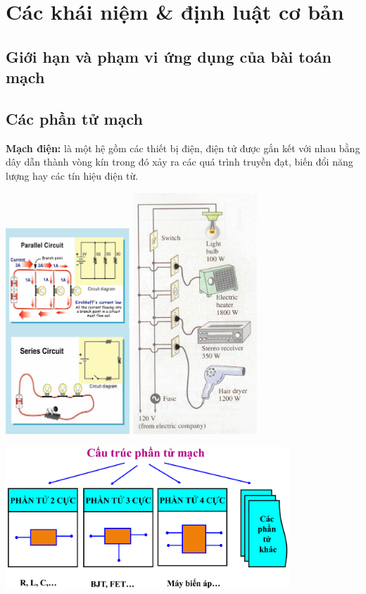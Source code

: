 \chapter{Các khái niệm \& định luật cơ bản}
\section{Giới hạn và phạm vi ứng dụng của bài toán mạch }
\section{Các phần tử mạch}
\textbf{Mạch điện:} là một hệ gồm các thiết bị điện, điện tử được gắn kết với nhau bằng dây dẫn thành vòng kín trong đó xảy ra các quá trình truyền đạt, biến đổi năng lượng hay các tín hiệu điện từ.
\begin{center}
  \includegraphics[width=0.35\textwidth]{./image/1(1).png} \quad \quad \quad \quad \includegraphics[width=0.35\textwidth]{./image/1(2).png}
\end{center}
\begin{center}
  \includegraphics[width=0.8\textwidth]{./image/2.png}
\end{center}

